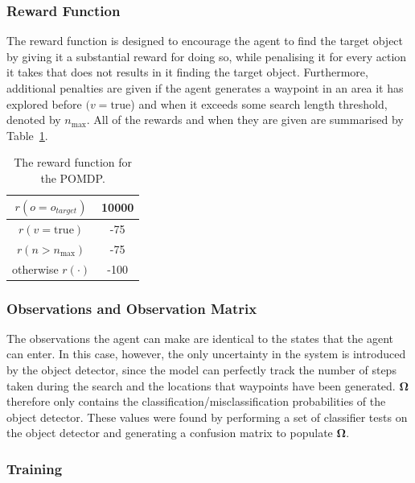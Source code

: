 \documentclass[runningheads]{llncs}
\begin{document}
\subsubsection{Reward Function}

The reward function is designed to encourage the agent to find the target object by giving it a substantial reward for doing so, while penalising it for every action it takes that does not results in it finding the target object.
Furthermore, additional penalties are given if the agent generates a waypoint in an area it has explored before $(v = \textrm{true}$) and when it exceeds some search length threshold, denoted by $n_{\max}$.
All of the rewards and when they are given are summarised by Table~\ref{tab:rewards}.

\begin{table}
  \centering
  \caption{The reward function for the POMDP. }\label{tab:rewards}
  \begin{tabular}{cc}
    \toprule
    $r(o = o_{target})$ & 10000 \\ \midrule
    $r(v = \textrm{true})$  & -75 \\ \midrule
    $r(n > n_{\max})$ & -75 \\ \midrule
    otherwise $r(\cdot)$ & -100  \\ \midrule
    \bottomrule
  \end{tabular}
\end{table}

\subsubsection{Observations and Observation Matrix}

The observations the agent can make are identical to the states that the agent can enter. 
In this case, however, the only uncertainty in the system is introduced by the object detector, since the model can perfectly track the number of steps taken during the search and the locations that waypoints have been generated.
$\mathbf{\Omega}$ therefore only contains the classification/misclassification probabilities of the object detector. 
These values were found by performing a set of classifier tests on the object detector and generating a confusion matrix to populate $\mathbf{\Omega}$.

\subsubsection{Training}
\end{document}
